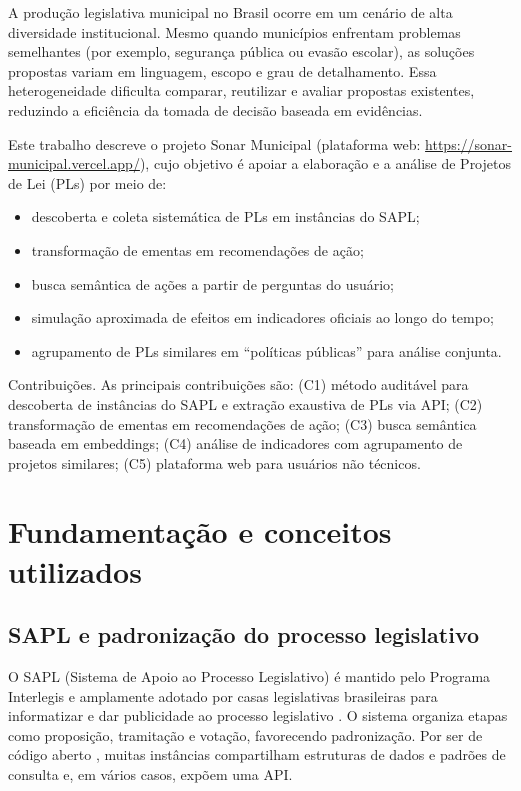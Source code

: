 \documentclass[10pt,a4paper]{article}
\begin{document}
A produção legislativa municipal no Brasil ocorre em um cenário de alta diversidade institucional. Mesmo quando municípios enfrentam problemas semelhantes (por exemplo, segurança pública ou evasão escolar), as soluções propostas variam em linguagem, escopo e grau de detalhamento. Essa heterogeneidade dificulta comparar, reutilizar e avaliar propostas existentes, reduzindo a eficiência da tomada de decisão baseada em evidências.

Este trabalho descreve o projeto Sonar Municipal (plataforma web: \url{https://sonar-municipal.vercel.app/}), cujo objetivo é apoiar a elaboração e a análise de Projetos de Lei (PLs) por meio de:
\begin{itemize}[leftmargin=*,nosep]
  \item descoberta e coleta sistemática de PLs em instâncias do SAPL;
  \item transformação de ementas em recomendações de ação;
  \item busca semântica de ações a partir de perguntas do usuário;
  \item simulação aproximada de efeitos em indicadores oficiais ao longo do tempo;
  \item agrupamento de PLs similares em ``políticas públicas'' para análise conjunta.
\end{itemize}

Contribuições. As principais contribuições são: (C1) método auditável para descoberta de instâncias do SAPL e extração exaustiva de PLs via API; (C2) transformação de ementas em recomendações de ação; (C3) busca semântica baseada em embeddings; (C4) análise de indicadores com agrupamento de projetos similares; (C5) plataforma web para usuários não técnicos.

\section{Fundamentação e conceitos utilizados}

\subsection{SAPL e padronização do processo legislativo}

O SAPL (Sistema de Apoio ao Processo Legislativo) é mantido pelo Programa Interlegis e amplamente adotado por casas legislativas brasileiras para informatizar e dar publicidade ao processo legislativo \cite{interlegis_sapl}. O sistema organiza etapas como proposição, tramitação e votação, favorecendo padronização. Por ser de código aberto \cite{interlegis_sapl_repo}, muitas instâncias compartilham estruturas de dados e padrões de consulta e, em vários casos, expõem uma API.
\end{document}
